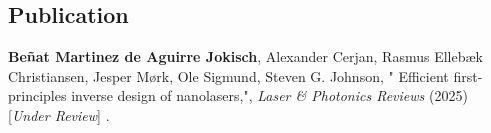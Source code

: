 \vspace*{0.4\textheight}
\begin{center}
  \begin{minipage}{0.9\linewidth}
    \section*{Publication \cite{ownpub4}}
    \textbf{Beñat Martinez de Aguirre Jokisch}, Alexander Cerjan, Rasmus Ellebæk Christiansen, Jesper Mørk, Ole Sigmund, Steven G. Johnson, "
    Efficient first-principles inverse design of nanolasers,", \textit{Laser \& Photonics Reviews} (2025) [\textit{Under Review}] .
  \end{minipage}
\end{center}
\newpage


%

